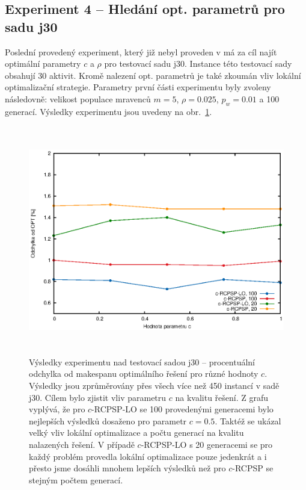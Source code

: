 \documentclass[a4paper,12pt]{article}
\begin{document}
\subsection{Experiment 4 -- Hledání opt. parametrů pro sadu j30}
Poslední provedený experiment, který již nebyl proveden v \cite{Merkle00antcolony, 1027745} má za cíl najít optimální parametry $c$ a $\rho$ pro 
testovací sadu j30. Instance této testovací sady obsahují 30 aktivit. Kromě nalezení opt. parametrů je také zkoumán vliv 
lokální optimalizační strategie. Parametry
první části experimentu byly zvoleny následovně: velikost populace mravenců $m = 5$, $\rho = 0.025$, $p_w = 0.01$ a 100
generací. Výsledky experimentu
jsou uvedeny na obr.~\ref{img:j30}.

\begin{figure}[!ht]
  \centering
  \includegraphics[height=10cm]{img/j30.eps}
  \caption{Výsledky experimentu nad testovací sadou j30 -- procentuální odchylka od makespanu optimálního řešení pro různé hodnoty $c$.
    Výsledky jsou zprůměrovány přes všech více než 450 instancí v sadě j30.
    Cílem bylo zjistit vliv parametru $c$ na kvalitu řešení. Z grafu vyplývá, že
     pro $c$-RCPSP-LO se 100 provedenými generacemi bylo nejlepších výsledků dosaženo pro parametr $c = 0.5$. Taktéž se 
     ukázal velký vliv lokální optimalizace a počtu generací na kvalitu nalazených řešení. V případě $c$-RCPSP-LO s 20 generacemi se pro každý problém provedla 
     lokální optimalizace pouze jedenkrát a i přesto jsme dosáhli mnohem lepších výsledků než pro $c$-RCPSP se stejným počtem generací.}
  \label{img:j30}
\end{figure}
\end{document}
